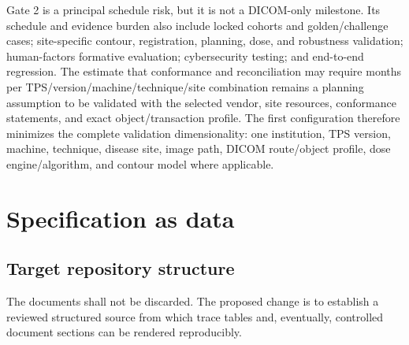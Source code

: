 \documentclass[11pt,letterpaper]{article}
\begin{document}
Gate 2 is a principal schedule risk, but it is not a DICOM-only milestone. Its schedule and evidence burden also include locked cohorts and golden/challenge cases; site-specific contour, registration, planning, dose, and robustness validation; human-factors formative evaluation; cybersecurity testing; and end-to-end regression. The estimate that conformance and reconciliation may require months per TPS/version/machine/technique/site combination remains a planning assumption to be validated with the selected vendor, site resources, conformance statements, and exact object/transaction profile. The first configuration therefore minimizes the complete validation dimensionality: one institution, TPS version, machine, technique, disease site, image path, DICOM route/object profile, dose engine/algorithm, and contour model where applicable.

\section{Specification as data}

\subsection{Target repository structure}

The documents shall not be discarded. The proposed change is to establish a reviewed structured source from which trace tables and, eventually, controlled document sections can be rendered reproducibly.
\end{document}
